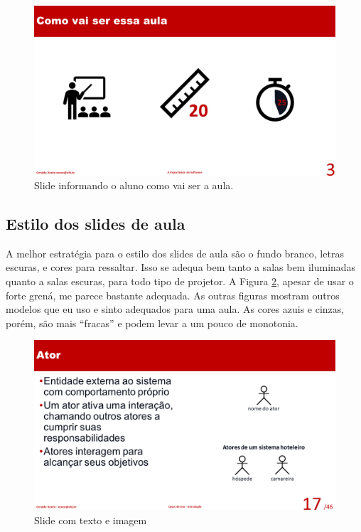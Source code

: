 \begin{figure}[htb]
    \centering
    \includegraphics[width=\tam\linewidth]{imagens/metodologia.png}
    \caption{Slide informando o aluno como vai ser a aula.}
    \label{fig:metodologia}
\end{figure}




\subsection{Estilo dos slides de aula}

A melhor estratégia para o estilo dos slides de aula são o fundo branco, letras escuras, e cores para ressaltar. Isso se adequa bem tanto a salas bem iluminadas quanto a salas escuras, para todo tipo de projetor. A Figura \ref{fig:teximag}, apesar de usar o forte grená, me parece bastante adequada. As outras figuras  mostram outros modelos que eu uso e sinto adequados para uma aula. As cores azuis e cinzas, porém, são mais ``fracas'' e podem levar a um pouco de monotonia.

\begin{figure}[hbt]
    \centering
    \includegraphics[width=\tam\linewidth]{imagens/slidecomimage.png}
    \caption{Slide com texto e imagem}
    \label{fig:teximag}
\end{figure}

